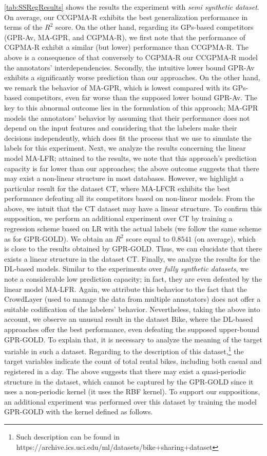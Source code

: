 \documentclass[journal]{IEEEtran}
\begin{document}
\cref{tab:SSRegResults} shows the results the experiment with \textit{semi synthetic dataset}. On average, our CCGPMA-R  exhibits the best generalization performance in terms of the $R^2$ score. On the other hand, regarding its GPs-based competitors (GPR-Av, MA-GPR, and CGPMA-R), we first note that the performance of CGPMA-R exhibit a similar (but lower) performance than CCGPMA-R. The above is a consequence of that conversely to CGPMA-R our CCGPMA-R model the annotators' interdependencies. Secondly, the intuitive lower bound GPR-Av exhibits a significantly worse prediction than our approaches. On the other hand, we remark the behavior of MA-GPR, which is lowest compared with its GPs-based competitors, even far worse than the supposed lower bound GPR-Av. The key to this abnormal outcome lies in the formulation of this approach; MA-GPR models the annotators' behavior by assuming that their performance does not depend on the input features and considering that the labelers make their decisions independently, which does fit the process that we use to simulate the labels for this experiment.
Next, we analyze the results concerning the linear model MA-LFR; attained to the results, we note that this approach's prediction capacity is far lower than our approaches; the above outcome suggests that there may exist a non-linear structure in most databases. However, we highlight a particular result for the dataset CT, where MA-LFCR exhibits the best performance defeating all its competitors based on non-linear models. From the above, we intuit that the CT dataset may have a linear structure. To confirm this supposition, we perform an additional experiment over CT by training a regression scheme based on LR with the actual labels (we follow the same scheme as for GPR-GOLD). We obtain an $R^2$ score equal to $0.8541$ (on average), which is close to the results obtained by GPR-GOLD. Thus, we can elucidate that there exists a linear structure in the dataset CT. Finally, we analyze the results for the DL-based models. Similar to the experiments over \textit{fully synthetic datasets}, we note a considerable low prediction capacity; in fact, they are even defeated by the linear model MA-LFR. Again, we attribute this behavior to the fact that the CrowdLayer (used to manage the data from multiple annotators) does not offer a suitable codification of the labelers' behavior. Nevertheless, taking the above into account, we observe an unusual result in the dataset Bike, where the DL-based approaches offer the best performance, even defeating the supposed upper-bound GPR-GOLD. To explain that, it is necessary to analyze the meaning of the target variable in such a dataset. Regarding to the description of this dataset,\footnote{Such description can be found in https://archive.ics.uci.edu/ml/datasets/bike+sharing+dataset} the target variables indicate the count of total rental bikes, including both casual and registered in a day. The above suggests that there may exist a quasi-periodic structure in the dataset, which cannot be captured by the GPR-GOLD since it uses a non-periodic kernel (it uses the RBF kernel). To support our suppositions, an additional experiment was performed over this dataset by training the model GPR-GOLD with the kernel defined as follows. 
\end{document}
